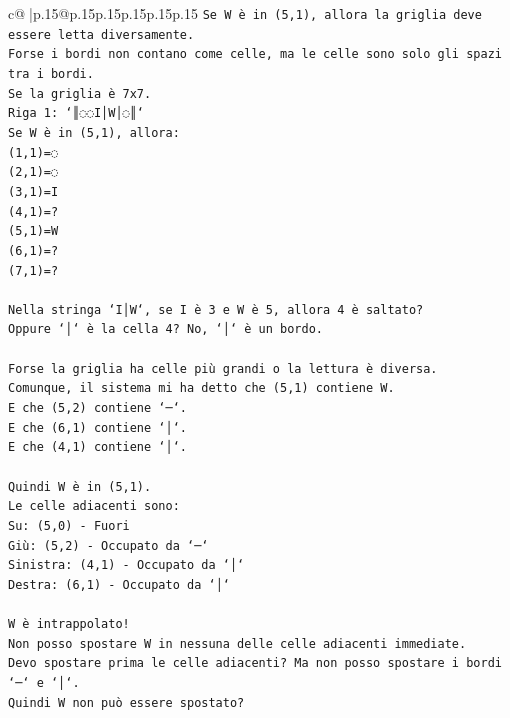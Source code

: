 \documentclass{article}
\begin{document}
{\begin{supertabular}{c@{$\;$}|p{.15\linewidth}@{}p{.15\linewidth}p{.15\linewidth}p{.15\linewidth}p{.15\linewidth}p{.15\linewidth}}
{{{\texttt{Se W è in (5,1), allora la griglia deve essere letta diversamente.} \\
\texttt{Forse i bordi non contano come celle, ma le celle sono solo gli spazi tra i bordi.} \\
\texttt{Se la griglia è 7x7.} \\
\texttt{Riga 1: `║◌◌I│W│◌║`} \\
\texttt{Se W è in (5,1), allora:} \\
\texttt{(1,1)=◌} \\
\texttt{(2,1)=◌} \\
\texttt{(3,1)=I} \\
\texttt{(4,1)=?} \\
\texttt{(5,1)=W} \\
\texttt{(6,1)=?} \\
\texttt{(7,1)=?} \\
\\ 
\texttt{Nella stringa `I│W`, se I è 3 e W è 5, allora 4 è saltato?} \\
\texttt{Oppure `│` è la cella 4? No, `│` è un bordo.} \\
\\ 
\texttt{Forse la griglia ha celle più grandi o la lettura è diversa.} \\
\texttt{Comunque, il sistema mi ha detto che (5,1) contiene W.} \\
\texttt{E che (5,2) contiene `─`.} \\
\texttt{E che (6,1) contiene `│`.} \\
\texttt{E che (4,1) contiene `│`.} \\
\\ 
\texttt{Quindi W è in (5,1).} \\
\texttt{Le celle adiacenti sono:} \\
\texttt{Su: (5,0) {-} Fuori} \\
\texttt{Giù: (5,2) {-} Occupato da `─`} \\
\texttt{Sinistra: (4,1) {-} Occupato da `│`} \\
\texttt{Destra: (6,1) {-} Occupato da `│`} \\
\\ 
\texttt{W è intrappolato!} \\
\texttt{Non posso spostare W in nessuna delle celle adiacenti immediate.} \\
\texttt{Devo spostare prima le celle adiacenti? Ma non posso spostare i bordi `─` e `│`.} \\
\texttt{Quindi W non può essere spostato?} \\
}}}
\end{supertabular}}
\end{document}
